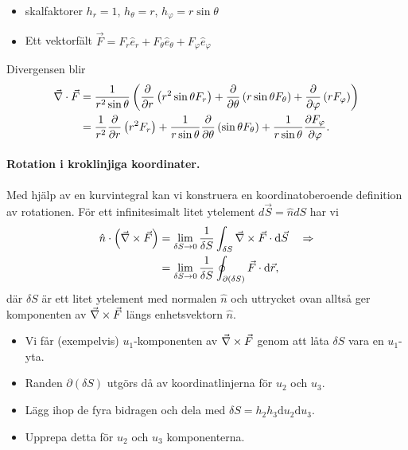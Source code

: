 \documentclass[%
oneside,                 %
final,                   %
10pt]{article}
\newenvironment{notice_mdfboxadmon}[1][]{
\begin{notice_mdfboxmdframed}[frametitle=#1]
}
{
\end{notice_mdfboxmdframed}
}
\begin{document}
\begin{notice_mdfboxadmon}
\begin{itemize}
\item skalfaktorer $h_r=1$, $h_\theta=r$, $h_\varphi = r \sin\theta$

\item Ett vektorfält $\vec{F} = F_r \hat{e}_r + F_\theta \hat{e}_\theta + F_\varphi \hat{e}_\varphi$
\end{itemize}

\noindent
Divergensen blir
\begin{align}
\vec{\nabla} \cdot \vec{F} &= \frac{1}{r^2 \sin\theta} \left( \frac{\partial}{\partial r} \left( r^2 \sin\theta F_r \right) + \frac{\partial}{\partial \theta} \left( r \sin\theta F_\theta \right) + \frac{\partial}{\partial \varphi} \left( r F_\varphi \right) \right) \nonumber \\
&= \frac{1}{r^2} \frac{\partial}{\partial r} \left( r^2 F_r \right) + \frac{1}{r \sin\theta} \frac{\partial}{\partial \theta} \left( \sin\theta F_\theta \right) + \frac{1}{r \sin\theta} \frac{\partial F_\varphi}{\partial \varphi}.
\end{align}
\end{notice_mdfboxadmon} %



\paragraph{Rotation i kroklinjiga koordinater.}
Med hjälp av en kurvintegral kan vi konstruera en koordinatoberoende definition av rotationen. För ett infinitesimalt litet ytelement $d\vec{S} = \hat{n} dS$ har vi
\begin{align}
  \hat{n} \cdot \left( \vec{\nabla} \times \vec{F} \right) &=  \lim_{\delta S \to 0} \frac{1}{\delta S} \int_{\delta S} \vec{\nabla} \times \vec{F} \cdot \mbox{d} \vec{S} \quad \Rightarrow \nonumber \\
  &= \lim_{\delta S \to 0} 
\frac{1}{\delta S} \oint_{\partial (\delta S)} \vec{F} \cdot \mbox{d}\vec{r},
\end{align}
där $\delta S$ är ett litet ytelement med normalen $\hat{n}$ och uttrycket ovan alltså ger komponenten av $\vec{\nabla} \times \vec{F}$ längs enhetsvektorn $\hat{n}$.
\begin{itemize}
\item Vi får (exempelvis) $u_1$-komponenten av $\vec{\nabla} \times \vec{F}$ genom att låta $\delta S$ vara en $u_1$-yta.

\item Randen $\partial(\delta S)$ utgörs då av koordinatlinjerna för $u_2$ och $u_3$.

\item Lägg ihop de fyra bidragen och dela med $\delta S = h_2 h_3 \mbox{d}u_2 \mbox{d}u_3$.

\item Upprepa detta för $u_2$ och $u_3$ komponenterna.
\end{itemize}
\end{document}
